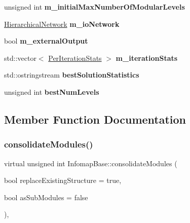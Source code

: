 \begin{DoxyCompactItemize}
\mbox{\label{classInfomapBase_addc56af424e75045a5267e24f54d0fd2}} 
unsigned int {\bfseries m\+\_\+initial\+Max\+Number\+Of\+Modular\+Levels}
\item 
\mbox{\label{classInfomapBase_af38843e45aa8dfbb152cf1afec177284}} 
\mbox{\hyperlink{classHierarchicalNetwork}{Hierarchical\+Network}} {\bfseries m\+\_\+io\+Network}
\item 
\mbox{\label{classInfomapBase_a1255bc8c63d90d691ecc3036e69a9616}} 
bool {\bfseries m\+\_\+external\+Output}
\item 
\mbox{\label{classInfomapBase_ad29b0a59237bca92eb644b4c30ee83d7}} 
std\+::vector$<$ \mbox{\hyperlink{structPerIterationStats}{Per\+Iteration\+Stats}} $>$ {\bfseries m\+\_\+iteration\+Stats}
\item 
\mbox{\label{classInfomapBase_a54d9b0ca622edb831bf6a918770ed965}} 
std\+::ostringstream {\bfseries best\+Solution\+Statistics}
\item 
\mbox{\label{classInfomapBase_a30ebedcdd39e023f72dbdf355be90577}} 
unsigned int {\bfseries best\+Num\+Levels}
\end{DoxyCompactItemize}


\subsection{Member Function Documentation}
\mbox{\label{classInfomapBase_ac6da8d87eb4d0760157367e8fcdfbdbc}} 
\subsubsection{\texorpdfstring{consolidate\+Modules()}{consolidateModules()}}
{\footnotesize\ttfamily virtual unsigned int Infomap\+Base\+::consolidate\+Modules (\begin{DoxyParamCaption}\item[{bool}]{replace\+Existing\+Structure = {\ttfamily true},  }\item[{bool}]{as\+Sub\+Modules = {\ttfamily false} }\end{DoxyParamCaption})\hspace{0.3cm}{\ttfamily [protected]}, {}}

